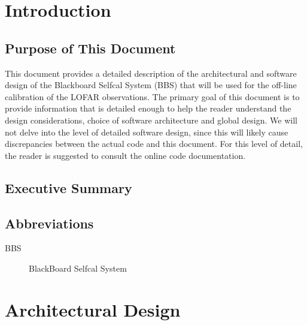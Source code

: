 \documentclass[10pt]{lofar}
\begin{document}
\maketitle
\newpage
%
\theDistributionList
\vspace{1cm}
\theDocumentRevision
\newpage
%
\begin{abstract}
\end{abstract}
\newpage
%
\tableofcontents
\newpage
%



\section{Introduction}
\label{sec:introduction}

\subsection{Purpose of This Document}
\label{subsec:purpose}
%
This document provides a detailed description of the architectural and
software design of the Blackboard Selfcal System (BBS) that will be used for
the off-line calibration of the LOFAR observations. The primary goal of this
document is to provide information that is detailed enough to help the reader
understand the design considerations, choice of software architecture and
global design. We will not delve into the level of detailed software design,
since this will likely cause discrepancies between the actual code and this
document. For this level of detail, the reader is suggested to consult the
online code documentation.

\subsection{Executive Summary}
\label{subsec:summary}

\subsection{Abbreviations}
\label{subsec:abbrev}
\begin{description}
\item [BBS] BlackBoard Selfcal System
\end{description}

\pagebreak

\section{Architectural Design}
\label{sec:architectural-design}
\end{document}
